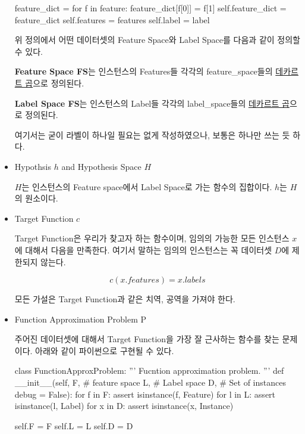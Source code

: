 \begin{itemize}
\begin{Python}
        feature_dict = {}
        for f in feature:
            feature_dict[f[0]] = f[1]
        self.feature_dict = feature_dict
        self.features = features
        self.label = label 

\end{Python}

위 정의에서 어떤 데이터셋의 Feature Space와 Label Space를 다음과 같이 정의할 수 있다. 
\begin{mydef}
\textbf{Feature Space FS}는 인스턴스의 Features들 각각의 feature\_space들의 \href{https://ko.wikipedia.org/wiki/%EA%B3%B1%EC%A7%91%ED%95%A9}{데카르트 곱}으로 정의된다. 
\end{mydef}

\begin{mydef}
\textbf{Label Space FS}는 인스턴스의 Label들 각각의 label\_space들의 \href{https://ko.wikipedia.org/wiki/%EA%B3%B1%EC%A7%91%ED%95%A9}{데카르트 곱}으로 정의된다. 
\end{mydef}

여기서는 굳이 라벨이 하나일 필요는 없게 작성하였으나, 보통은 하나만 쓰는 듯 하다. 
 
\item{Hypothsis $h$ and Hypothesis Space $H$}

$H$는 인스턴스의 Feature space에서 Label Space로 가는 함수의 집합이다. $h$는 $H$의 원소이다. 

\item{Target Function $c$}

Target Function은 우리가 찾고자 하는 함수이며, 임의의 가능한 모든 인스턴스 $x$에 대해서 다음을 만족한다. 여기서 말하는 임의의 인스턴스는 꼭 데이터셋 $D$에 제한되지 않는다. 

\begin{equation} 
c(x.features) = x.labels
\end{equation}

모든 가설은 Target Function과 같은 치역, 공역을 가져야 한다. 

\item{Function Approximation Problem P}

주어진 데이터셋에 대해서 Target Function을 가장 잘 근사하는 함수를 찾는 문제이다. 아래와 같이 파이썬으로 구현될 수 있다. 

\begin{Python} 
class FunctionApproxProblem:
    ''' Fucntion approximation problem. 
    '''
    def __init__(self, F, # feature space
                       L, # Label space
                       D, # Set of instances
                       debug = False):
        for f in F:
            assert isinstance(f, Feature)
        for l in L:
            assert isinstance(l, Label)
        for x in D:
            assert isinstance(x, Instance)
            
        self.F = F
        self.L = L
        self.D = D
\end{Python}
\end{itemize}

